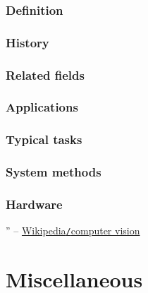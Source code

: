 \documentclass{article}
\begin{document}
\subsubsection{Definition}

\subsubsection{History}

\subsubsection{Related fields}

\subsubsection{Applications}

\subsubsection{Typical tasks}

\subsubsection{System methods}

\subsubsection{Hardware}

'' -- \href{https://en.wikipedia.org/wiki/Computer_vision}{Wikipedia{\tt/}computer vision}


\section{Miscellaneous}


\printbibliography[heading=bibintoc]
	
\end{document}
